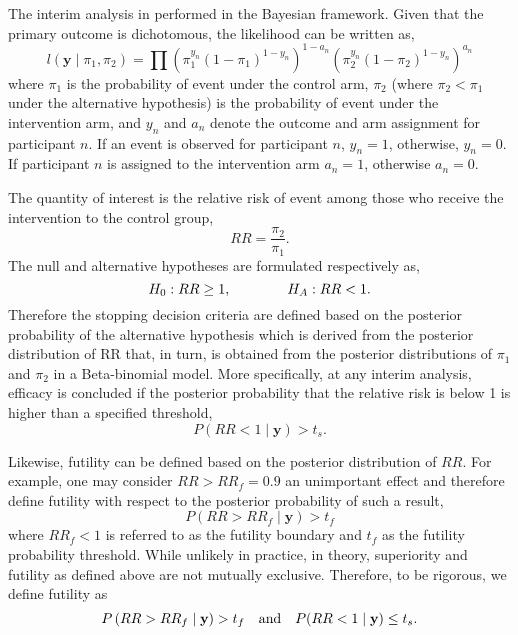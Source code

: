 \documentclass[12pt]{article}
\begin{document}
The interim analysis in performed in the Bayesian framework. Given that the primary outcome is dichotomous, the likelihood can be written as,
\begin{equation}
l(\mathbf{y}\mid \pi_1, \pi_2) = \prod \left(\pi_1^{y_n}(1-\pi_1)^{1-y_n}\right)^{1-a_n}\left(\pi_2^{y_n}(1-\pi_2)^{1-y_n}\right)^{a_n}
\end{equation}
where  $\pi_1$ is the probability of event under the control arm, $\pi_2$ (where $\pi_2<\pi_1$ under the alternative hypothesis) is the probability of event under the intervention arm, and $y_n$ and $a_n$ denote the outcome and arm assignment for participant $n$. If an event is observed for participant $n$, $y_n = 1$, otherwise, $y_n = 0$. If participant $n$ is assigned to the intervention arm $a_n=1$, otherwise $a_n=0$.

The quantity of interest is the relative risk of event among those who receive the intervention to the control group, 
\begin{equation*}
RR = \frac{\pi_2}{\pi_1}.
\end{equation*}
The null and alternative hypotheses are formulated respectively as,
\begin{equation*}
H_0: RR \geq 1, \hskip 40pt H_A: RR <1.
\end{equation*}
Therefore the stopping decision criteria are defined based on the posterior probability of the alternative hypothesis which is derived from the posterior distribution of RR that, in turn, is obtained from the posterior distributions of $\pi_1$ and $\pi_2$ in a Beta-binomial model. More specifically, at any interim analysis, efficacy is concluded if the posterior probability that the relative risk is below 1 is higher than a specified threshold,
\begin{equation}
P\left(RR < 1 \mid \mathbf{y} \right)>t_s.
\end{equation}

Likewise, futility can be defined based on the posterior distribution of $RR$. For example, one may consider  $RR> RR_f = 0.9$ an unimportant effect and therefore define futility with respect to the posterior probability of such a  result,
\begin{equation}
P\left(RR >RR_f\mid \mathbf{y} \right)>t_f
\end{equation}
where $RR_f<1$ is referred to as the futility boundary and $t_f$ as the futility probability threshold. While unlikely in practice, in theory, superiority and futility as defined above are not mutually exclusive. Therefore, to be rigorous, we define futility as 
\begin{equation}
\label{fut}
P\left(RR >RR_f\mid \mathbf{y} \right)>t_f \hskip 10pt \text{and} \hskip 10pt P(RR<1\mid \mathbf{y})\leq t_s.
\end{equation}
\end{document}
